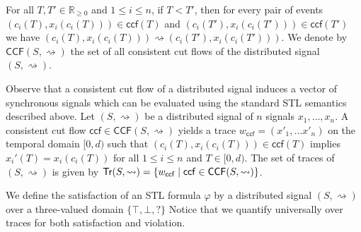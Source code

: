\documentclass[iicol,lineno]{sn-jnl}
\renewcommand{\cref}{\Cref}
\newcommand{\hb}{\rightsquigarrow}
\newcommand{\fr}{\mathsf{fr}}
\newcommand{\tr}{\mathsf{Tr}}
\newcommand{\CCF}{\mathsf{CCF}}
\newcommand{\ccf}{\mathsf{ccf}}
\newcommand{\R}{\mathbb{R}}
\newcommand{\?}{\text{?}}
\newcommand{\suchthat}{\;\ifnum\currentgrouptype=16 \middle\fi|\;}
\let\st\suchthat
\newtheorem{example}{Example}
\begin{document}
	For all $T,T' \in \R_{\geq 0}$ and $1 \leq i \leq n$, if $T < T'$, then for every pair of events $(c_i(T), x_i(c_i(T))) \in \ccf(T)$ and $(c_i(T'), x_i(c_i(T'))) \in \ccf(T')$ we have $(c_i(T), x_i(c_i(T))) \hb (c_i(T'), x_i(c_i(T')))$.
	We denote by $\CCF(S,{\hb})$ the set of all consistent cut flows of the distributed signal $(S,{\hb})$.
	
	
	
	
	
	
	Observe that a consistent cut flow of a distributed signal induces a vector of synchronous signals which can be evaluated using the standard STL semantics described above.
	Let $(S,{\hb})$ be a distributed signal of $n$ signals $x_1, \ldots, x_n$.
	A consistent cut flow $\ccf \in \CCF(S,{\hb})$ yields a trace $w_{\ccf} = (x'_1, \ldots x'_n)$ on the temporal domain $[0,d)$ such that $(c_i(T), x_i(c_i(T))) \in \ccf(T)$ implies $x_i'(T) = x_i(c_i(T))$ for all $1 \leq i \leq n$ and $T \in [0, d)$.
	The set of traces of $(S,{\hb})$ is given by $\tr(S,{\hb}) = \{ w_{\ccf} \st \ccf \in \CCF(S,{\hb})\}$.
	
	We define the satisfaction of an STL formula $\varphi$ by a distributed signal $(S,{\hb})$ over a three-valued domain $\{\top, \bot, {?}\}$
	Notice that we quantify universally over traces for both satisfaction and violation.
	
\end{document}
